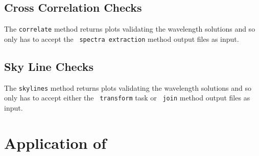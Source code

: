 \subsection{Cross Correlation Checks} \label{subsec:test_corr}

The \texttt{correlate} method returns plots validating the wavelength solutions and so only has to accept the \polsalt\ \texttt{spectra extraction} method output files as input.


\subsection{Sky Line Checks} \label{subsec:test_sky}

The \texttt{skylines} method returns plots validating the wavelength solutions and so only has to accept either the \iraf\ \texttt{transform} task or \stops\ \texttt{join} method output files as input.


\section[Application of \textsc{stops}]{Application of \stops} \label{sec:results_unpub}




